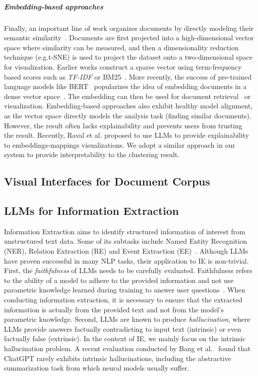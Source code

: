\vspace*{-0.2cm}
\subparagraph*{Embedding-based approaches}
Finally, an important line of work organizes documents by directly modeling their semantic similarity~\cite{steinbach2000doccluster}.
Documents are first projected into a high-dimensional vector space where similarity can be measured, and then a dimensionality reduction technique (e.g.t-SNE) is used to project the dataset onto a two-dimensional space for visualization.
Earlier works construct a sparse vector using term-frequency based scores such as \textit{TF-IDF} or BM25~\cite{choo2013utopian,sherkat2018interactive}.
More recently, the success of pre-trained language models like BERT~\cite{devlin2018bert} popularizes the idea of embedding documents in a dense vector space~\cite{narechania2022vitality,tu2023sdrquerier,qiu2022docflow}.
The embedding can then be used for document retrieval~\cite{karpukhin-etal-2020-dense, izacard2022unsupervised} or visualization.
Embedding-based approaches also exhibit healthy model alignment, as the vector space directly models the analysis task (finding similar documents). 
However, the result often lacks explainability and prevents users from trusting the result.
Recently, Raval et al.\cite{raval2023explainandtrust} proposed to use LLMs to provide explainability to embeddings-mappings visualizations.
We adopt a similar approach in our system to provide interpretability to the clustering result.

\subsection{Visual Interfaces for Document Corpus}
\subsection{LLMs for Information Extraction}
Information Extraction aims to identify structured information of interest from unstructured text data.
Some of its subtasks include Named Entity Recognition (NER), Relation Extraction (RE) and Event Extraction (EE)~\cite{nasar2021named, xiang2019surveyee}.
Although LLMs have proven successful in many NLP tasks, their application to IE is non-trivial.
First, the \textit{faithfulness} of LLMs needs to be carefully evaluated.
Faithfulness refers to the ability of a model to adhere to the provided information and not use parametric knowledge learned during training to answer user questions~\cite{zhou2023contextfaithful}.
When conducting information extraction, it is necessary to ensure that the extracted information is actually from the provided text and not from the model's parametric knowledge.
Second, LLMs are known to produce \textit{hallucination}, where LLMs provide answers factually contradicting to input text (intrinsic) or even factually false (extrinsic). 
In the context of IE, we mainly focus on the intrinsic hallucination problem.
A recent evaluation conducted by Bang et al.~\cite{bang2023multitask} found that ChatGPT rarely exhibits intrinsic hallucinations, including the abstractive summarization task from which neural models usually suffer.

